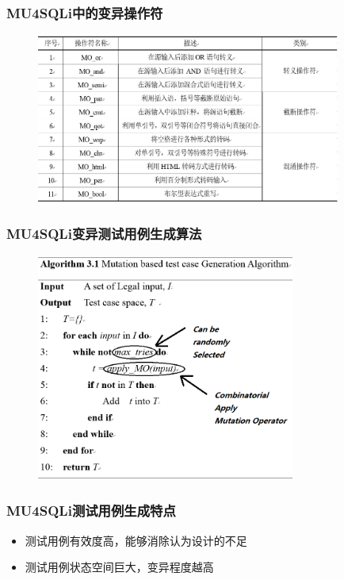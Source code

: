 \documentclass{beamer}
\begin{document}
\begin{CJK*}{UTF8}{}


\begin{frame}
\frametitle{MU4SQLi中的变异操作符}
\begin{figure}  
 \centering  
 \includegraphics[width=100mm]{1.jpg}\\  
\end{figure}

\end{frame}

\begin{frame}
\frametitle{MU4SQLi变异测试用例生成算法}
\begin{figure}  
 \centering  
 \includegraphics[width=85mm]{2.png}\\  
\end{figure}

\end{frame}

\begin{frame}
\frametitle{	MU4SQLi测试用例生成特点}
\begin{itemize}
\item 测试用例有效度高，能够消除认为设计的不足
\item 测试用例状态空间巨大，变异程度越高
\end{itemize}


\end{frame}
\end{CJK*}
\end{document}
